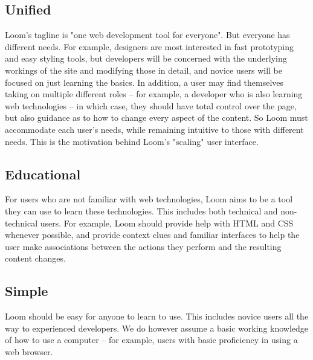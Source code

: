 \documentclass[conference, letterpaper]{IEEEtran}
\begin{document}
\subsection{Unified}
Loom's tagline is "one web development tool for everyone". But everyone has different needs. For example, designers are most interested in fast prototyping and easy styling tools, but developers will be concerned with the underlying workings of the site and modifying those in detail, and novice users will be focused on just learning the basics. In addition, a user may find themselves taking on multiple different roles -- for example, a developer who is also learning web technologies -- in which case, they should have total control over the page, but also guidance as to how to change every aspect of the content. So Loom must accommodate each user's needs, while remaining intuitive to those with different needs. This is the motivation behind Loom's "scaling" user interface.

\subsection{Educational}
For users who are not familiar with web technologies, Loom aims to be a tool they can use to learn these technologies. This includes both technical and non-technical users. For example, Loom should provide help with HTML and CSS whenever possible, and provide context clues and familiar interfaces to help the user make associations between the actions they perform and the resulting content changes.

\subsection{Simple}
Loom should be easy for anyone to learn to use. This includes novice users all the way to experienced developers. We do however assume a basic working knowledge of how to use a computer -- for example, users with basic proficiency in using a web browser.

%
%
\end{document}

